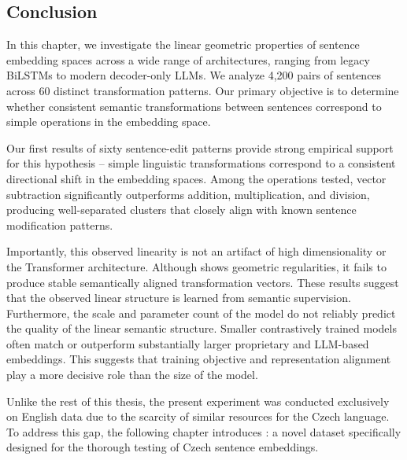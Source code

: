 \subsection{Conclusion}
\label{conclusion}
In this chapter, we investigate the linear geometric properties of sentence embedding spaces across a wide range of architectures, ranging from legacy BiLSTMs to modern decoder-only LLMs. We analyze 4,200 pairs of sentences across 60 distinct transformation patterns. Our primary objective is to determine whether consistent semantic transformations between sentences correspond to simple operations in the embedding space.

Our first results of sixty sentence-edit patterns provide strong empirical support for this hypothesis -- simple linguistic transformations correspond to a consistent directional shift in the embedding spaces. Among the operations tested, vector subtraction significantly outperforms addition, multiplication, and division, producing well-separated clusters that closely align with known sentence modification patterns.

Importantly, this observed linearity is not an artifact of high dimensionality or the Transformer architecture. Although \enrandombert shows geometric regularities, it fails to produce stable semantically aligned transformation vectors. These results suggest that the observed linear structure is learned from semantic supervision. Furthermore, the scale and parameter count of the model do not reliably predict the quality of the linear semantic structure. Smaller contrastively trained models often match or outperform substantially larger proprietary and LLM-based embeddings. This suggests that training objective and representation alignment play a more decisive role than the size of the model.

Unlike the rest of this thesis, the present experiment was conducted exclusively on English data due to the scarcity of similar resources for the Czech language. To address this gap, the following chapter introduces \costra: a novel dataset specifically designed for the thorough testing of Czech sentence embeddings.

